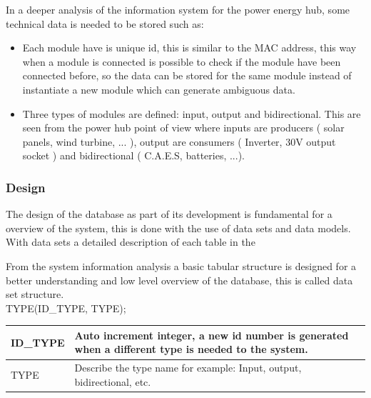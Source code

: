 In a deeper analysis of the information system for the power energy hub, some technical data is needed to be stored such as:
	\begin{itemize}
		\item Each module have is unique id, this is similar to the MAC address, this way when a module is connected is possible to check if the module have been connected before, so the data can be stored for the same module instead of instantiate a new module which can generate ambiguous data.
		\item Three types of modules are defined: input, output and bidirectional. This are seen from the power hub point of view where inputs are producers ( solar panels, wind turbine, ... ), output are consumers ( Inverter, 30V output socket ) and bidirectional ( C.A.E.S, batteries, ...).
	\end{itemize}

%	
%	
\subsubsection{Design}
The design of the database as part of its development is fundamental for a overview of the system, this is done with the use of data sets and data models. With data sets a detailed description of each table in the 

From the system information analysis a basic tabular structure is designed for a better understanding and low level overview of the database, this is called data set structure.\\

TYPE(ID\_TYPE, TYPE);

\begin{table}[H]
\centering
	\begin{tabular}{| p{2cm} | p{10cm} |}
		\hline
		ID\_TYPE & Auto increment integer, a new id number is generated when a different type is needed to the system. \\\hline
		TYPE & Describe the type name for example: Input, output, bidirectional, etc.\\\hline
	\end{tabular}
\end{table}

